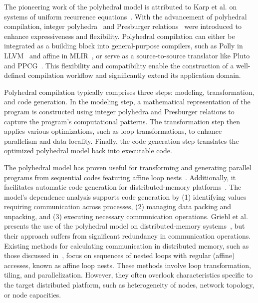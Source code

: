 \documentclass[a4paper, 11pt]{article}
\begin{document}
The pioneering work of the polyhedral model is attributed to Karp et al. on systems of uniform recurrence equations~\cite{KarpMW67}. With the advancement of polyhedral compilation, integer polyhedra~\cite{LoechnerW97} and Presburger relations~\cite{PughW93, PughW94} were introduced to enhance expressiveness and flexibility. Polyhedral compilation can either be integrated as a building block into general-purpose compilers, such as Polly in LLVM~\cite{GrosserGL12} and affine in MLIR~\cite{lattner_mlir_2020}, or serve as a source-to-source translator like Pluto~\cite{uday08cc, uday08pldi} and PPCG~\cite{Verdoolaege2013PPCG}. This flexibility and compatibility enable the construction of a well-defined compilation workflow and significantly extend its application domain.

Polyhedral compilation typically comprises three steps: modeling, transformation, and code generation. In the modeling step, a mathematical representation of the program is constructed using integer polyhedra and Presburger relations to capture the program's computational patterns. The transformation step then applies various optimizations, such as loop transformations, to enhance parallelism and data locality. Finally, the code generation step translates the optimized polyhedral model back into executable code.

The polyhedral model has proven useful for transforming and generating parallel programs from sequential codes featuring affine loop nests~\cite{Bastoul04}. Additionally, it facilitates automatic code generation for distributed-memory platforms~\cite{10.1145/173262.155102}. The model's dependence analysis supports code generation by (1) identifying values requiring communication across processes, (2) managing data packing and unpacking, and (3) executing necessary communication operations. Griebl et al. presents the use of the polyhedral model on distributed-memory systems~\cite{ClassenG06}, but their approach suffers from significant redundancy in communication operations. Existing methods for calculating communication in distributed memory, such as those discussed in~\cite{BikshandiGHAFGPP06, DathathriMB16, Bondhugula13, ReddyB14, yuki2013parametrically}, focus on sequences of nested loops with regular (affine) accesses, known as affine loop nests. These methods involve loop transformation, tiling, and parallelization. However, they often overlook characteristics specific to the target distributed platform, such as heterogeneity of nodes, network topology, or node capacities.
\end{document}
